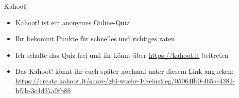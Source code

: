 
\framePrevEpisode

\begin{frame}{Kahoot!}
	\begin{itemize}[<+->]
		\item Kahoot! ist ein anonymes Online-Quiz
		\item Ihr bekommt Punkte für schnelles und richtiges raten
		\item Ich schalte das Quiz frei und ihr könnt über \url{https://kahoot.it} beitreten
		\item Das Kahoot! könnt ihr euch später nochmal unter diesem Link angucken: \\
			\url{https://create.kahoot.it/share/gbi-woche-10-einstieg/05064fb0-465a-4382-bf7b-3c4d37a9fb86}
	\end{itemize}
\end{frame}





